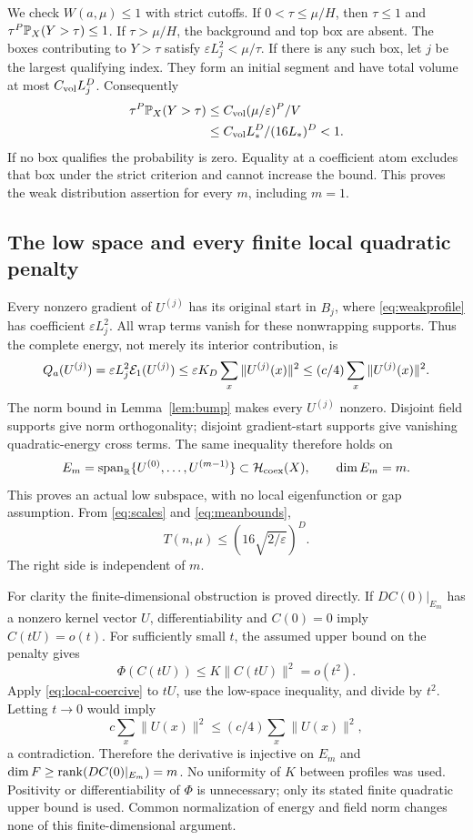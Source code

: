 We check $W(a,\mu)\le1$ with strict cutoffs. If
$0<\tau\le\mu/H$, then $\tau\le1$ and
$\tau^P\mathbb P_X(Y>\tau)\le1$. If $\tau>\mu/H$, the background and top
box are absent. The boxes contributing to $Y>\tau$ satisfy
$\varepsilon L_j^2<\mu/\tau$. If there is any such box, let $j$ be the
largest qualifying index. They form an initial segment and have total
volume at most $C_{\rm vol}L_j^D$. Consequently
\begin{align}\label{eq:weakcheck}
 \tau^P\mathbb P_X(Y>\tau)
 &\le C_{\rm vol}(\mu/\varepsilon)^P/V\nonumber\\
 &\le C_{\rm vol}L_*^D/(16L_*)^D<1.
\end{align}
If no box qualifies the probability is zero. Equality at a coefficient atom
excludes that box under the strict criterion and cannot increase the bound.
This proves the weak distribution assertion for every $m$, including $m=1$.

\subsection{The low space and every finite local quadratic penalty}
Every nonzero gradient of $U^{(j)}$ has its original start in $B_j$,
where \eqref{eq:weakprofile} has coefficient $\varepsilon L_j^2$.
All wrap terms vanish for these nonwrapping supports. Thus the complete
energy, not merely its interior contribution, is
\begin{equation}\label{eq:weightedbump}
 Q_a(U^{(j)})=\varepsilon L_j^2\mathcal E_1(U^{(j)})
 \le\varepsilon K_D\sum_x\|U^{(j)}(x)\|^2
 \le(c/4)\sum_x\|U^{(j)}(x)\|^2.
\end{equation}
The norm bound in Lemma~\ref{lem:bump} makes every $U^{(j)}$ nonzero.
Disjoint field supports give norm orthogonality; disjoint gradient-start
supports give vanishing quadratic-energy cross terms. The same inequality
therefore holds on
\[
 E_m=\operatorname{span}_{\mathbb R}\{U^{(0)},\ldots,U^{(m-1)}\}
       \subset\mathcal H_{\rm coex}(X),\qquad \dim E_m=m.
\]
This proves an actual low subspace, with no local eigenfunction or gap
assumption. From \eqref{eq:scales} and \eqref{eq:meanbounds},
\begin{equation}\label{eq:targetbounded}
 T(n,\mu)\le\left(16\sqrt{2/\varepsilon}\right)^D.
\end{equation}
The right side is independent of $m$.

For clarity the finite-dimensional obstruction is proved directly. If
$DC(0)|_{E_m}$ has a nonzero kernel vector $U$, differentiability and
$C(0)=0$ imply $C(tU)=o(t)$. For sufficiently small $t$, the assumed
upper bound on the penalty gives
\[
 \Phi(C(tU))\le K\|C(tU)\|^2=o(t^2).
\]
Apply \eqref{eq:local-coercive} to $tU$, use the low-space inequality,
and divide by $t^2$. Letting $t\to0$ would imply
\[
 c\sum_x\|U(x)\|^2\le(c/4)\sum_x\|U(x)\|^2,
\]
a contradiction. Therefore the derivative is injective on $E_m$ and
$\dim F\ge\operatorname{rank}(DC(0)|_{E_m})=m$. No uniformity of $K$ between profiles
was used. Positivity or differentiability of $\Phi$ is unnecessary; only
its stated finite quadratic upper bound is used. Common normalization of
energy and field norm changes none of this finite-dimensional argument.

